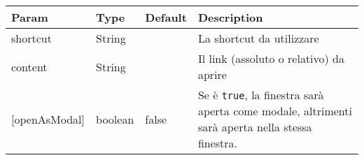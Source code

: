 \begin{longtable}[]{@{}llll@{}}
\toprule
\begin{minipage}[b]{0.22\columnwidth}\raggedright
Param\strut
\end{minipage} & \begin{minipage}[b]{0.22\columnwidth}\raggedright
Type\strut
\end{minipage} & \begin{minipage}[b]{0.22\columnwidth}\raggedright
Default\strut
\end{minipage} & \begin{minipage}[b]{0.22\columnwidth}\raggedright
Description\strut
\end{minipage}\tabularnewline
\midrule
\endhead
\begin{minipage}[t]{0.22\columnwidth}\raggedright
shortcut\strut
\end{minipage} & \begin{minipage}[t]{0.22\columnwidth}\raggedright
String\strut
\end{minipage} & \begin{minipage}[t]{0.22\columnwidth}\raggedright
\strut
\end{minipage} & \begin{minipage}[t]{0.22\columnwidth}\raggedright
La shortcut da utilizzare\strut
\end{minipage}\tabularnewline
\begin{minipage}[t]{0.22\columnwidth}\raggedright
content\strut
\end{minipage} & \begin{minipage}[t]{0.22\columnwidth}\raggedright
String\strut
\end{minipage} & \begin{minipage}[t]{0.22\columnwidth}\raggedright
\strut
\end{minipage} & \begin{minipage}[t]{0.22\columnwidth}\raggedright
Il link (assoluto o relativo) da aprire\strut
\end{minipage}\tabularnewline
\begin{minipage}[t]{0.22\columnwidth}\raggedright
{[}openAsModal{]}\strut
\end{minipage} & \begin{minipage}[t]{0.22\columnwidth}\raggedright
boolean\strut
\end{minipage} & \begin{minipage}[t]{0.22\columnwidth}\raggedright
false\strut
\end{minipage} & \begin{minipage}[t]{0.22\columnwidth}\raggedright
Se è \texttt{true}, la finestra sarà aperta come modale, altrimenti sarà
aperta nella stessa finestra.\strut
\end{minipage}\tabularnewline
\bottomrule
\end{longtable}

